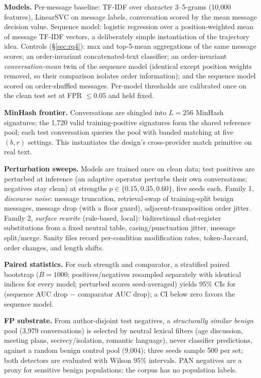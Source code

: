 \documentclass[letterpaper,twocolumn,10pt]{article}
\begin{document}
\textbf{Models.} Per-message baseline: TF-IDF over character 3--5-grams
(10{,}000 features), LinearSVC on message labels, conversation scored by the
mean message decision value. Sequence model: logistic regression over a
position-weighted mean of message TF-IDF vectors, a deliberately simple
instantiation of the trajectory idea. Controls (\S\ref{sec:rq4}): max and
top-5-mean aggregations of the same message scores; an order-invariant
concatenated-text classifier; an order-invariant \emph{conversation-mean}
twin of the sequence model (identical except position weights removed, so
their comparison isolates order information); and the sequence model scored
on order-shuffled messages. Per-model thresholds are calibrated once on the
clean test set at FPR $\leq 0.05$ and held fixed.

\textbf{MinHash frontier.} Conversations are shingled into $L=256$ MinHash
signatures; the 1{,}720 valid training-positive signatures form the
shared reference pool; each test conversation queries the pool with banded
matching at five $(b,r)$ settings. This instantiates the design's
cross-provider match primitive on real text.

\textbf{Perturbation sweeps.} Models are trained once on clean data; test
positives are perturbed at inference (an adaptive operator perturbs their
own conversations; negatives stay clean) at strengths
$p \in \{0.15, 0.35, 0.60\}$, five seeds each. Family 1, \emph{discourse
noise}: message truncation, retrieval-swap of training-split benign
messages, message drop (with a floor guard), adjacent-transposition order
jitter. Family 2, \emph{surface rewrite} (rule-based, local): bidirectional
chat-register substitutions from a fixed neutral table, casing/punctuation
jitter, message split/merge. Sanity files record per-condition modification
rates, token-Jaccard, order changes, and length shifts.

\textbf{Paired statistics.} For each strength and comparator, a stratified
paired bootstrap ($B{=}1000$; positives/negatives resampled separately with
identical indices for every model; perturbed scores seed-averaged) yields
95\% CIs for (sequence AUC drop $-$ comparator AUC drop); a CI below zero
favors the sequence model.

\textbf{FP substrate.} From author-disjoint test negatives, a
\emph{structurally similar benign} pool (3{,}979 conversations) is selected
by neutral lexical filters (age discussion, meeting plans,
secrecy/isolation, romantic language), never classifier predictions,
against a random benign control pool (9{,}004); three seeds sample 500 per
set; both detectors are evaluated with Wilson 95\% intervals. PAN negatives
are a proxy for sensitive benign populations; the corpus has no population
labels.
\end{document}
